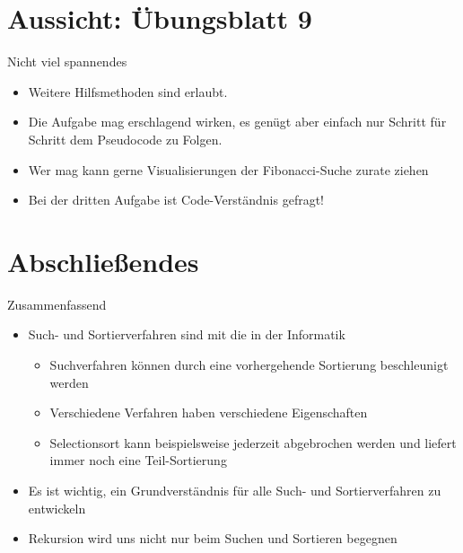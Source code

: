 \iffull
{}
\section{Aussicht: Übungsblatt 9}
\begin{frame}{Nicht viel spannendes}
    \begin{itemize}[<+(1)->]
        \itemsep5pt
        \item Weitere Hilfsmethoden sind erlaubt.
        \item Die Aufgabe mag erschlagend wirken, es genügt aber einfach nur Schritt für Schritt dem Pseudocode zu Folgen.
        \item Wer mag kann gerne Visualisierungen der Fibonacci-Suche zurate ziehen 
        \item Bei der dritten Aufgabe ist Code-Verständnis gefragt!
    \end{itemize}
\end{frame}

\fi

\section{Abschließendes}
{\SummaryFrame
\begin{frame}[t]{Zusammenfassend}
\pause \printBibCommand
\vfill\vfill %
\begin{itemize}[<+(1)->]
    \itemsep4pt
    \item Such- und Sortierverfahren sind mit die  in der Informatik
    \begin{itemize}
        \item Suchverfahren können durch eine vorhergehende Sortierung beschleunigt werden
        \item Verschiedene Verfahren haben verschiedene Eigenschaften
        \item Selectionsort kann beispielsweise jederzeit abgebrochen werden und liefert immer noch eine Teil-Sortierung 
    \end{itemize}
    \item Es ist wichtig, ein Grundverständnis für alle Such- und Sortierverfahren zu entwickeln
    \item Rekursion wird uns nicht nur beim Suchen und Sortieren begegnen
\end{itemize}
\end{frame}
}

